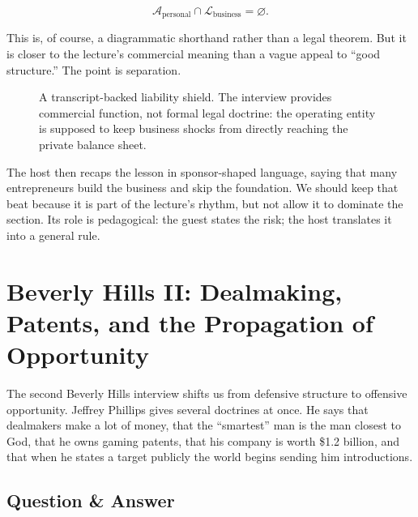\begin{equation}
\mathcal{A}_{\mathrm{personal}} \cap \mathcal{L}_{\mathrm{business}} = \varnothing.
\end{equation}

This is, of course, a diagrammatic shorthand rather than a legal theorem. But it is closer to the lecture's commercial meaning than a vague appeal to ``good structure.'' The point is separation.

\begin{figure}[h]
\centering
{}
\caption{A transcript-backed liability shield. The interview provides commercial function, not formal legal doctrine: the operating entity is supposed to keep business shocks from directly reaching the private balance sheet.}
\end{figure}

The host then recaps the lesson in sponsor-shaped language, saying that many entrepreneurs build the business and skip the foundation. We should keep that beat because it is part of the lecture's rhythm, but not allow it to dominate the section. Its role is pedagogical: the guest states the risk; the host translates it into a general rule.

\section{Beverly Hills II: Dealmaking, Patents, and the Propagation of Opportunity}

The second Beverly Hills interview shifts us from defensive structure to offensive opportunity. Jeffrey Phillips gives several doctrines at once. He says that dealmakers make a lot of money, that the ``smartest'' man is the man closest to God, that he owns gaming patents, that his company is worth \$1.2 billion, and that when he states a target publicly the world begins sending him introductions.

\subsection{Question \& Answer}

